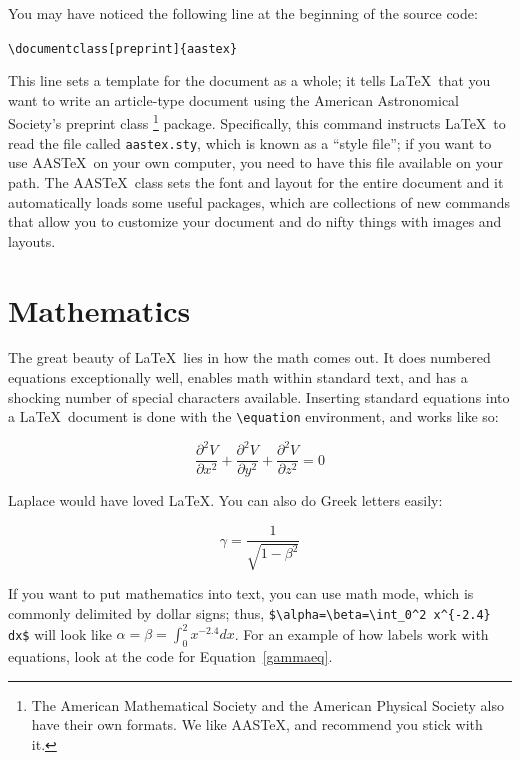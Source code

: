 \documentclass[preprint]{aastex}
\begin{document}
        You may have noticed the following line at the beginning of the
source code: \begin{center} {\verb&\documentclass[preprint]{aastex}&}
\end{center} \noindent This line sets a template for the document as a
whole; it tells \LaTeX\ that you want to write an article-type document
using the American Astronomical Society's preprint class \footnote{The
American Mathematical Society and the American Physical Society also
have their own formats.  We like AAS\TeX, and recommend you stick with
it.} package.  Specifically, this command instructs \LaTeX \ to read the
file called \verb$aastex.sty$, which is known as a ``style file''; if
you want to use AAS\TeX \ on your own computer, you need to have this file
available on your path. The AAS\TeX\ class sets the font and layout for
the entire document and it automatically loads some useful packages,
which are collections of new commands that allow you to customize your
document and do nifty things with images and layouts.  


\section{Mathematics}\label{mathsec}

        The great beauty of \LaTeX\ lies in how the math comes out.  It
does numbered equations exceptionally well, enables math within standard
text, and has a shocking number of special characters available. 
Inserting standard equations into a \LaTeX\ document is done with the
\verb&\equation& environment, and works like so:

\begin{equation} \label{laplacian}
\frac{\partial^2 V} {\partial x^2}+\frac{\partial^2 V}
{\partial y^2} + \frac{\partial^2 V}{\partial z^2}=0
\end{equation}

Laplace would have loved \LaTeX.  You can also do Greek letters easily:

\begin{equation} \label{gammaeq}
\gamma=\frac{1}{\sqrt{1-\beta^2}}
\end{equation}

\noindent If you want to put mathematics into text, you can use math
mode, which is commonly delimited by dollar signs; thus,
\verb&$\alpha=\beta=\int_0^2 x^{-2.4} dx$& will look like
$\alpha=\beta=\int_0^2 x^{-2.4} dx$.  For an example of how labels work
with equations, look at the code for Equation~\ref{gammaeq}. 
\end{document}

